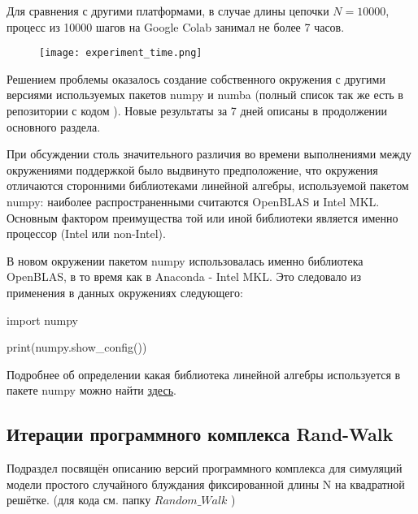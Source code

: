 Для сравнения с другими платформами, в случае длины цепочки $N=10000$, процесс из 10000 шагов на Google Colab занимал не более 7 часов.

\begin{figure}[h]
    \centering
    \texttt{[image: experiment\_time.png]}
\end{figure}

Решением проблемы оказалось создание собственного окружения с другими версиями используемых пакетов numpy и numba (полный список так же есть в репозитории с кодом \cite{web:ProjectMagnetRepos}). Новые результаты за 7 дней описаны в продолжении основного раздела.

При обсуждении столь значительного различия во времени выполнениями между окружениями поддержкой было выдвинуто предположение, что окружения отличаются сторонними библиотеками линейной алгебры, используемой пакетом numpy: наиболее распространенными считаются OpenBLAS и Intel MKL. Основным фактором преимущества той или иной библиотеки является именно процессор (Intel или non-Intel). 

В новом окружении пакетом numpy использовалась именно библиотека OpenBLAS, в то время как в Anaconda - Intel MKL. Это следовало из применения в данных окружениях следующего:

\begin{code}
import numpy

print(numpy.show\_config())
\end{code}

Подробнее об определении какая библиотека линейной алгебры используется в пакете numpy можно найти \href{https://shaalltime.medium.com/benchmark-numpy-with-openblas-and-mkl-library-on-amd-ryzen-3950x-cpu-96184f91057f}{здесь}. 


\subsection{Итерации программного комплекса Rand-Walk}

Подраздел посвящён описанию версий программного комплекса для симуляций модели простого случайного блуждания фиксированной длины N на квадратной решётке.
(для кода см. папку $Random\_Walk$  \cite{web:ProjectMagnetRepos})

